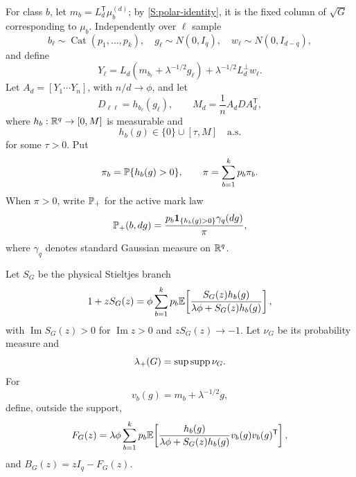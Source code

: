 For class $b$, let $m_b=L_d^{\mathsf T}\mu_b^{(d)}$; by
\eqref{S:polar-identity}, it is the fixed column of $\sqrt G$ corresponding
to $\mu_b$. Independently over $\ell$ sample
\begin{equation}
b_\ell\sim\operatorname{Cat}(p_1,\ldots,p_k),\quad
g_\ell\sim N(0,I_q),\quad
w_\ell\sim N(0,I_{d-q}),
\end{equation}
and define
\begin{equation}
Y_\ell
=L_d\!\left(m_{b_\ell}+\lambda^{-1/2}g_\ell\right)
+\lambda^{-1/2}L_d^\perp w_\ell.
\label{S:Y}
\end{equation}
Let $A_d=[Y_1\cdots Y_n]$, with $n/d\to\phi$, and let
\begin{equation}
D_{\ell\ell}=h_{b_\ell}(g_\ell),\qquad
M_d=\frac1nA_dDA_d^{\mathsf T},
\label{S:M}
\end{equation}
where $h_b:\mathbb{R}^q\to[0,M]$ is measurable and
\begin{equation}
h_b(g)\in\{0\}\cup[\tau,M]\quad\text{a.s.}
\label{S:gap}
\end{equation}
for some $\tau>0$. Put
\begin{equation}
\pi_b=\mathbb{P}\{h_b(g)>0\},\qquad
\pi=\sum_{b=1}^kp_b\pi_b.
\label{S:pi}
\end{equation}
When $\pi>0$, write $\mathbb{P}_+$ for the active mark law
\begin{equation}
\mathbb{P}_+(b,dg)
=
\frac{p_b\mathbf{1}_{\{h_b(g)>0\}}\gamma_q(dg)}{\pi},
\label{S:active-law}
\end{equation}
where $\gamma_q$ denotes standard Gaussian measure on $\mathbb{R}^q$.

Let $S_G$ be the physical Stieltjes branch
\begin{equation}
1+zS_G(z)=
\phi\sum_{b=1}^kp_b
\mathbb{E}\!\left[
\frac{S_G(z)h_b(g)}
{\lambda\phi+S_G(z)h_b(g)}
\right],
\label{S:fixedpoint}
\end{equation}
with $\operatorname{Im}S_G(z)>0$ for $\operatorname{Im}z>0$ and
$zS_G(z)\to-1$. Let $\nu_G$ be its probability measure and
\begin{equation}
\lambda_+(G)=\sup\operatorname{supp}\nu_G.
\end{equation}
For
\begin{equation}
v_b(g)=m_b+\lambda^{-1/2}g,
\end{equation}
define, outside the support,
\begin{equation}
F_G(z)=
\lambda\phi\sum_{b=1}^kp_b
\mathbb{E}\!\left[
\frac{h_b(g)}
{\lambda\phi+S_G(z)h_b(g)}
v_b(g)v_b(g)^{\mathsf T}
\right],
\label{S:F}
\end{equation}
and $B_G(z)=zI_q-F_G(z)$.

